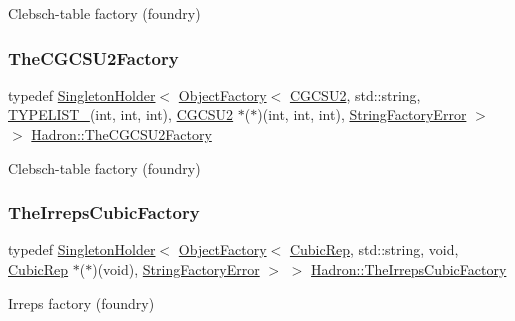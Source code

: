 Clebsch-\/table factory (foundry) 

\mbox{\label{namespaceHadron_a78329899af02f016ab89457f10d6e6ff}} 
\subsubsection{\texorpdfstring{TheCGCSU2Factory}{TheCGCSU2Factory}}
{\footnotesize\ttfamily typedef \mbox{\hyperlink{classUtil_1_1SingletonHolder}{Singleton\+Holder}}$<$ \mbox{\hyperlink{classUtil_1_1ObjectFactory}{Object\+Factory}}$<$ \mbox{\hyperlink{classHadron_1_1CGCSU2}{C\+G\+C\+S\+U2}}, std\+::string, \mbox{\hyperlink{install_2include_2adat_2typelist_8h_a0309f68a543c5c0994f9edc0e56dc59f}{T\+Y\+P\+E\+L\+I\+S\+T\+\_}}(int, int, int), \mbox{\hyperlink{classHadron_1_1CGCSU2}{C\+G\+C\+S\+U2}} $\ast$($\ast$)(int, int, int), \mbox{\hyperlink{structUtil_1_1StringFactoryError}{String\+Factory\+Error}} $>$ $>$ \mbox{\hyperlink{namespaceHadron_a78329899af02f016ab89457f10d6e6ff}{Hadron\+::\+The\+C\+G\+C\+S\+U2\+Factory}}}



Clebsch-\/table factory (foundry) 

\mbox{\label{namespaceHadron_a9b693812688b7b56d095964989de20b2}} 
\subsubsection{\texorpdfstring{TheIrrepsCubicFactory}{TheIrrepsCubicFactory}}
{\footnotesize\ttfamily typedef \mbox{\hyperlink{classUtil_1_1SingletonHolder}{Singleton\+Holder}}$<$ \mbox{\hyperlink{classUtil_1_1ObjectFactory}{Object\+Factory}}$<$ \mbox{\hyperlink{structHadron_1_1CubicRep}{Cubic\+Rep}}, std\+::string, void, \mbox{\hyperlink{structHadron_1_1CubicRep}{Cubic\+Rep}} $\ast$($\ast$)(void), \mbox{\hyperlink{structUtil_1_1StringFactoryError}{String\+Factory\+Error}} $>$ $>$ \mbox{\hyperlink{namespaceHadron_a9b693812688b7b56d095964989de20b2}{Hadron\+::\+The\+Irreps\+Cubic\+Factory}}}



Irreps factory (foundry) 

\mbox{\label{namespaceHadron_ae17c10048cdbba5312fcaa06692d632a}} 
